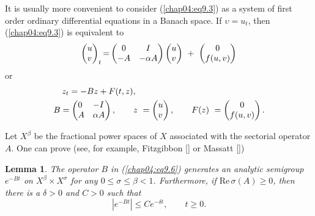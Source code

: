 \documentclass{surv-l}
\theoremstyle{plain}
\newtheorem{lemma}[theorem]{Lemma}
\theoremstyle{definition}
\numberwithin{equation}{section}
\numberwithin{figure}{chapter}
\begin{document}
It is usually more convenient to consider (\ref{chap04:eq9.3}) as a system of first order ordinary differential equations in a Banach space. If $\upsilon=u_{t}$, then (\ref{chap04:eq9.3}) is equivalent to
\begin{align*}
\left(\begin{array}{@{}l@{}}
u\\
v
\end{array}\right)_{t}{=}\left(\begin{array}{@{}cc@{}}
0 & I\\
-A & -\alpha A
\end{array}\right)\left(\begin{array}{@{}l@{}}
u\\
v
\end{array}\right)\ +\ \left(\begin{array}{@{}c@{}}
0\\
f(u,v)
\end{array}\right)
\end{align*}
or
\begin{equation}\label{chap04:eq9.6}
\begin{split}
&\quad z_{t}=-Bz+F(t, z),\\
&B=\left(\begin{array}{@{}ll@{}}
0 & -I\\
A & \alpha A
\end{array}\right),\qquad z\ =\left(\begin{array}{@{}l@{}}
u\\
v
\end{array}\right),\qquad F(z)\ =\left(\begin{array}{@{}c@{}}
0\\
f(u,v)
\end{array}\right).
\end{split}
\end{equation}

Let $X^{\beta}$ be the fractional power spaces of $X$ associated with the sectorial operator $A$. One can prove (see, for example, Fitzgibbon [\citeyear{1981f}] or Massatt [\citeyear{1983m}])


\begin{lemma}\label{lem4.9.1}
The operator $B$ in \emph{(\ref{chap04:eq9.6})} generates an analytic semigroup $e^{-Bt}$ on $X^{\beta}\times X^{\sigma}$ for any $0\leq\sigma\leq\beta<1$. Furthermore, if $\mathrm{Re}\,\sigma(A)\geq 0$, then there is a $\delta>0$ and $C>0$ such that
\begin{equation}\label{chap04:eq9.7}
|e^{-Bt}|\leq Ce^{-\delta t},\qquad t\geq 0.
\end{equation}
\end{lemma}
\end{document}
